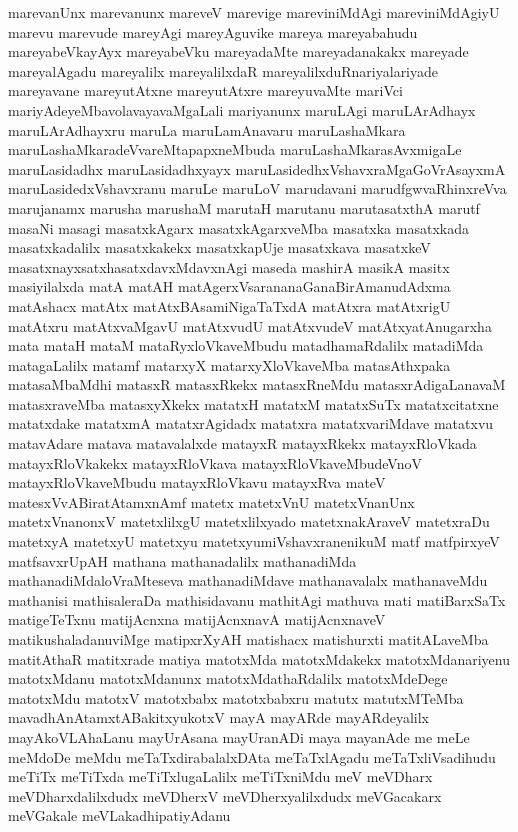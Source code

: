 {marevanUnx
marevanunx
mareveV
marevige
mareviniMdAgi
mareviniMdAgiyU
marevu
marevude
mareyAgi
mareyAguvike
mareya
mareyabahudu
mareyabeVkayAyx
mareyabeVku
mareyadaMte
mareyadanakakx
mareyade
mareyalAgadu
mareyalilx
mareyalilxdaR
mareyalilxduRnariyalariyade
mareyavane
mareyutAtxne
mareyutAtxre
mareyuvaMte
mariVci
mariyAdeyeMbavolavayavaMgaLali
mariyanunx
maruLAgi
maruLArAdhayx
maruLArAdhayxru
maruLa
maruLamAnavaru
maruLashaMkara
maruLashaMkaradeVvareMtapapxneMbuda
maruLashaMkarasAvxmigaLe
maruLasidadhx
maruLasidadhxyayx
maruLasidedhxVshavxraMgaGoVrAsayxmA
maruLasidedxVshavxranu
maruLe
maruLoV
marudavani
marudfgwvaRhinxreVva
marujanamx
marusha
marushaM
marutaH
marutanu
marutasatxthA
marutf
masaNi
masagi
masatxkAgarx
masatxkAgarxveMba
masatxka
masatxkada
masatxkadalilx
masatxkakekx
masatxkapUje
masatxkava
masatxkeV
masatxnayxsatxhasatxdavxMdavxnAgi
maseda
mashirA
masikA
masitx
masiyilalxda
matA
matAH
matAgerxVsarananaGanaBirAmanudAdxma
matAshacx
matAtx
matAtxBAsamiNigaTaTxdA
matAtxra
matAtxrigU
matAtxru
matAtxvaMgavU
matAtxvudU
matAtxvudeV
matAtxyatAnugarxha
mata
mataH
mataM
mataRyxloVkaveMbudu
matadhamaRdalilx
matadiMda
matagaLalilx
matamf
matarxyX
matarxyXloVkaveMba
matasAthxpaka
matasaMbaMdhi
matasxR
matasxRkekx
matasxRneMdu
matasxrAdigaLanavaM
matasxraveMba
matasxyXkekx
matatxH
matatxM
matatxSuTx
matatxcitatxne
matatxdake
matatxmA
matatxrAgidadx
matatxra
matatxvariMdave
matatxvu
matavAdare
matava
matavalalxde
matayxR
matayxRkekx
matayxRloVkada
matayxRloVkakekx
matayxRloVkava
matayxRloVkaveMbudeVnoV
matayxRloVkaveMbudu
matayxRloVkavu
matayxRva
mateV
matesxVvABiratAtamxnAmf
matetx
matetxVnU
matetxVnanUnx
matetxVnanonxV
matetxlilxgU
matetxlilxyado
matetxnakAraveV
matetxraDu
matetxyA
matetxyU
matetxyu
matetxyumiVshavxranenikuM
matf
matfpirxyeV
matfsavxrUpAH
mathana
mathanadalilx
mathanadiMda
mathanadiMdaloVraMteseva
mathanadiMdave
mathanavalalx
mathanaveMdu
mathanisi
mathisaleraDa
mathisidavanu
mathitAgi
mathuva
mati
matiBarxSaTx
matigeTeTxnu
matijAcnxna
matijAcnxnavA
matijAcnxnaveV
matikushaladanuviMge
matipxrXyAH
matishacx
matishurxti
matitALaveMba
matitAthaR
matitxrade
matiya
matotxMda
matotxMdakekx
matotxMdanariyenu
matotxMdanu
matotxMdanunx
matotxMdathaRdalilx
matotxMdeDege
matotxMdu
matotxV
matotxbabx
matotxbabxru
matutx
matutxMTeMba
mavadhAnAtamxtABakitxyukotxV
mayA
mayARde
mayARdeyalilx
mayAkoVLAhaLanu
mayUrAsana
mayUranADi
maya
mayanAde
me
meLe
meMdoDe
meMdu
meTaTxdirabalalxDAta
meTaTxlAgadu
meTaTxliVsadihudu
meTiTx
meTiTxda
meTiTxlugaLalilx
meTiTxniMdu
meV
meVDharx
meVDharxdalilxdudx
meVDherxV
meVDherxyalilxdudx
meVGacakarx
meVGakale
meVLakadhipatiyAdanu
}
